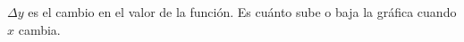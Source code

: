 \documentclass[preview]{standalone}
\begin{document}
\begin{center}
$\Delta y$ es el cambio en el valor de la función.
Es cuánto sube o baja la gráfica cuando $x$ cambia.
\end{center}
\end{document}
